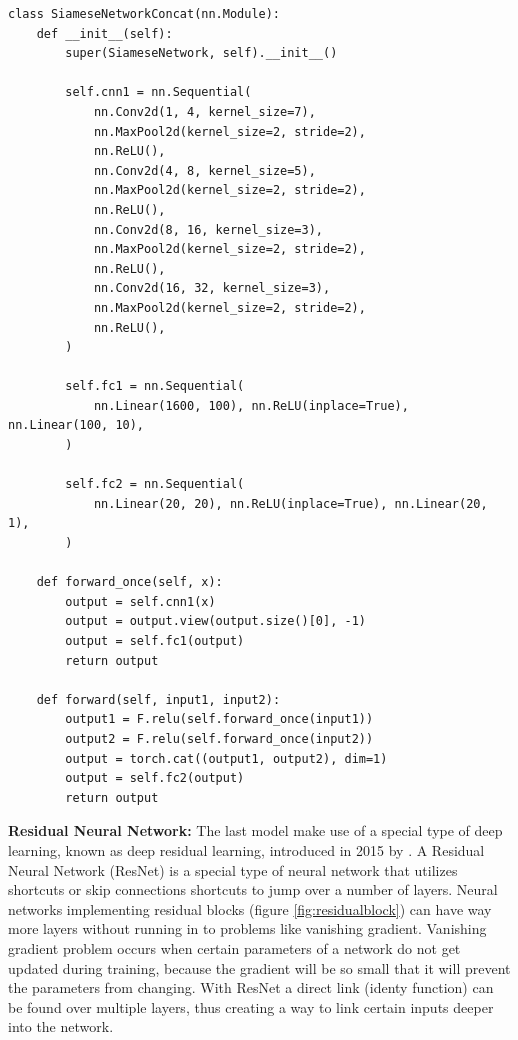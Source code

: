  \begin{lstlisting}[caption={Code for CNN with Cross Entropy Loss}, label={lst:cnncel}, frame=single, breaklines=true]
 class SiameseNetworkConcat(nn.Module):
    def __init__(self):
        super(SiameseNetwork, self).__init__()

        self.cnn1 = nn.Sequential(
            nn.Conv2d(1, 4, kernel_size=7),
            nn.MaxPool2d(kernel_size=2, stride=2),
            nn.ReLU(),
            nn.Conv2d(4, 8, kernel_size=5),
            nn.MaxPool2d(kernel_size=2, stride=2),
            nn.ReLU(),
            nn.Conv2d(8, 16, kernel_size=3),
            nn.MaxPool2d(kernel_size=2, stride=2),
            nn.ReLU(),
            nn.Conv2d(16, 32, kernel_size=3),
            nn.MaxPool2d(kernel_size=2, stride=2),
            nn.ReLU(),
        )

        self.fc1 = nn.Sequential(
            nn.Linear(1600, 100), nn.ReLU(inplace=True), nn.Linear(100, 10),
        )

        self.fc2 = nn.Sequential(
            nn.Linear(20, 20), nn.ReLU(inplace=True), nn.Linear(20, 1),
        )

    def forward_once(self, x):
        output = self.cnn1(x)
        output = output.view(output.size()[0], -1)
        output = self.fc1(output)
        return output

    def forward(self, input1, input2):
        output1 = F.relu(self.forward_once(input1))
        output2 = F.relu(self.forward_once(input2))
        output = torch.cat((output1, output2), dim=1)
        output = self.fc2(output)
        return output
 \end{lstlisting}

\textbf{Residual Neural Network:} The last model make use of a special type of deep learning, known as deep residual learning, introduced in 2015 by \cite{he2016deep}. A Residual Neural Network (ResNet) is a special type of neural network that utilizes shortcuts or skip connections shortcuts to jump over a number of layers. Neural networks implementing residual blocks (figure \ref{fig:residualblock}) can have way more layers without running in to problems like vanishing gradient. Vanishing gradient problem occurs when certain parameters of a network do not get updated during training, because the gradient will be so small that it will prevent the parameters from changing. With ResNet a direct link (identy function) can be found over multiple layers, thus creating a way to link certain inputs deeper into the network.

